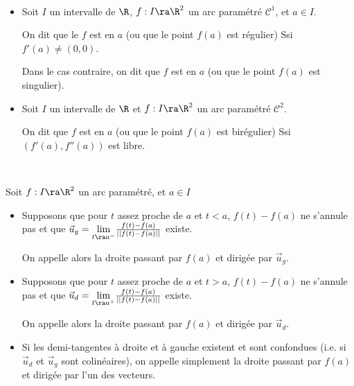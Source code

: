 \documentclass[12pt]{article}
\begin{document}
\begin{Def}~

\begin{itemize}
\item 
Soit $I$ un intervalle de $\R$, $f:I\ra \R^2$ un arc paramétré
$\mathcal{C}^1$, et $a\in I$.


On dit que le $f$ est  en $a$ (ou que le point $f(a)$
est régulier\footnotemark) Ssi $f'(a)\neq(0,0)$.

Dans le cas contraire, on dit que $f$ est  en $a$ (ou
que le point $f(a)$ est singulier).

\item 
Soit $I$ un intervalle de $\R$ et $f:I\ra \R^2$ un arc paramétré
$\mathcal{C}^2$.


On dit que $f$ est   en $a$ (ou que le point $f(a)$
  est birégulier) Ssi
  $(f'(a),f''(a))$ est libre.
\end{itemize}


\end{Def}



\begin{Def}~

Soit $f:I\ra \R^2$ un arc paramétré, et $a\in I$
\begin{itemize}


\item Supposons que pour $t$ assez proche de $a$ et $t<a$, $f(t)-f(a)$ ne
  s'annule pas et que $\vec{u}_g=\underset{t\ra a^-}{\lim}\frac{f(t)-f(a)}{||f(t)-f(a)||}$ existe. 

On appelle alors  la droite passant par
$f(a)$ et dirigée par $\vec{u}_g$.

\item Supposons que pour $t$ assez proche de $a$ et $t>a$, $f(t)-f(a)$ ne
  s'annule pas et que $\vec{u}_d=\underset{t\ra
  a^+}{\lim}\frac{f(t)-f(a)}{||f(t)-f(a)||}$ existe. 

On appelle alors  la droite passant par
$f(a)$ et dirigée par $\vec{u}_d$.

\item Si les demi-tangentes à droite et à gauche existent et sont
  confondues (i.e. si $\vec{u}_d$ et $\vec{u}_g$ sont colinéaires), on appelle
  simplement  la droite passant par $f(a)$ et dirigée par
  l'un des vecteurs.


\end{itemize}


\end{Def}
\end{document}
